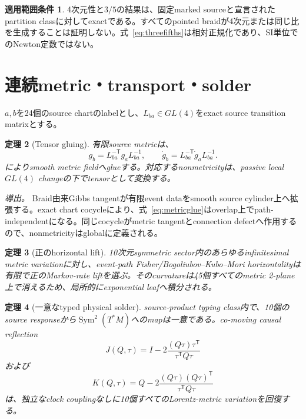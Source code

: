 \documentclass[11pt]{article}
\newtheorem{theorem}{定理}[section]
\theoremstyle{definition}
\newtheorem{scope}[theorem]{適用範囲条件}
\theoremstyle{remark}
\newcommand{\Sym}{\operatorname{Sym}}
\begin{document}
\begin{scope}
4次元性と$3/5$の結果は、固定marked sourceと宣言されたpartition classに対してexactである。すべてのpointed braidが4次元または同じ比を生成することは証明しない。式~\eqref{eq:threefifths}は相対正規化であり、SI単位でのNewton定数ではない。
\end{scope}

\section{連続metric・transport・solder}

$a,b$を24個のsource chartのlabelとし、$L_{ba}\in GL(4)$をexact source transition matrixとする。

\begin{theorem}[Tensor gluing]
有限source metricは、
\begin{equation}
g_b=L_{ba}^{-\mathsf T}g_aL_{ba}^{-1},
\qquad
\dot g_b=L_{ba}^{-\mathsf T}\dot g_aL_{ba}^{-1}.
\label{eq:metricglue}
\end{equation}
によりsmooth metric fieldへglueする。対応するnonmetricityは、passive local $GL(4)$ changeの下でtensorとして変換する。
\end{theorem}

\textit{導出。} Braid由来Gibbs tangentが有限event dataをsmooth source cylinder上へ拡張する。exact chart cocycleにより、式~\eqref{eq:metricglue}はoverlap上でpath-independentになる。同じcocycleがmetric tangentとconnection defectへ作用するので、nonmetricityはglobalに定義される。

\begin{theorem}[正のhorizontal lift]
10次元symmetric sector内のあらゆるinfinitesimal metric variationに対し、event-path Fisher/Bogoliubov--Kubo--Mori horizontalityは有限で正のMarkov-rate liftを選ぶ。そのcurvatureは45個すべてのmetric 2-plane上で消えるため、局所的にexponential leafへ積分される。
\end{theorem}

\begin{theorem}[一意なtyped physical solder]
source-product typing class内で、10個のsource responseから$\Sym^2(T^*M)$へのmapは一意である。co-moving causal reflection
\begin{equation}
J(Q,\tau)=I-2\frac{(Q\tau)\tau^{\mathsf T}}{\tau^{\mathsf T}Q\tau}
\end{equation}
および
\begin{equation}
K(Q,\tau)=Q-2\frac{(Q\tau)(Q\tau)^{\mathsf T}}{\tau^{\mathsf T}Q\tau}
\label{eq:comoving}
\end{equation}
は、独立なclock couplingなしに10個すべてのLorentz-metric variationを回復する。
\end{theorem}
\end{document}
